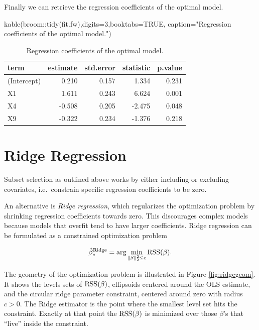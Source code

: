 \documentclass[
]{book}
\newenvironment{Shaded}{\begin{snugshade}}{\end{snugshade}}
\newcommand{\AttributeTok}[1]{\textcolor[rgb]{0.77,0.63,0.00}{#1}}
\newcommand{\ConstantTok}[1]{\textcolor[rgb]{0.00,0.00,0.00}{#1}}
\newcommand{\DecValTok}[1]{\textcolor[rgb]{0.00,0.00,0.81}{#1}}
\newcommand{\FunctionTok}[1]{\textcolor[rgb]{0.00,0.00,0.00}{#1}}
\newcommand{\NormalTok}[1]{#1}
\newcommand{\SpecialCharTok}[1]{\textcolor[rgb]{0.00,0.00,0.00}{#1}}
\newcommand{\StringTok}[1]{\textcolor[rgb]{0.31,0.60,0.02}{#1}}
\begin{document}
Finally we can retrieve the regression coefficients of the optimal model.

\begin{Shaded}
\begin{Highlighting}[]
\FunctionTok{kable}\NormalTok{(broom}\SpecialCharTok{::}\FunctionTok{tidy}\NormalTok{(fit.fw),}\AttributeTok{digits=}\DecValTok{3}\NormalTok{,}\AttributeTok{booktabs=}\ConstantTok{TRUE}\NormalTok{,}
      \AttributeTok{caption=}\StringTok{"Regression coefficients of the optimal model."}\NormalTok{)}
\end{Highlighting}
\end{Shaded}

\begin{table}

\caption{\label{tab:unnamed-chunk-24}Regression coefficients of the optimal model.}
\centering
\begin{tabular}[t]{lrrrr}
\toprule
term & estimate & std.error & statistic & p.value\\
\midrule
(Intercept) & 0.210 & 0.157 & 1.334 & 0.231\\
X1 & 1.611 & 0.243 & 6.624 & 0.001\\
X4 & -0.508 & 0.205 & -2.475 & 0.048\\
X9 & -0.322 & 0.234 & -1.376 & 0.218\\
\bottomrule
\end{tabular}
\end{table}

\hypertarget{ridge-regression}{%
\section{Ridge Regression}\label{ridge-regression}}

Subset selection as outlined above works by either including or
excluding covariates, i.e.~constrain specific regression coefficients to be zero.

An alternative is \emph{Ridge regression}, which regularizes the optimization problem by shrinking regression coefficients towards zero. This discourages complex models because
models that overfit tend to have larger coefficients. Ridge regression can be formulated as a constrained optimization problem

\[
\hat{\beta}^{\rm Ridge}_{c}=\text{arg}\min\limits_{\|\beta\|_2^2\leq c}\textrm{RSS}(\beta).
\]

The geometry of the optimization problem is illustrated in Figure \ref{fig:ridgegeom}. It shows the levels sets of \({\rm RSS}(\beta)\), ellipsoids centered around the OLS estimate, and the circular ridge
parameter constraint, centered around zero with radius \(c > 0\). The Ridge estimator
is the point where the smallest level set hits the constraint. Exactly at that point the \(\rm{RSS}(\beta)\) is
minimized over those \(\beta\)'s that ``live'' inside the constraint.
\end{document}
